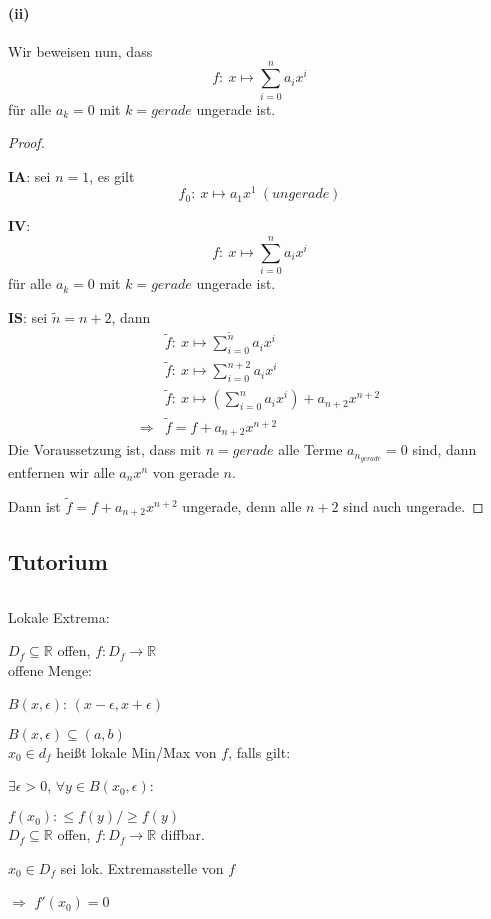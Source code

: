 \newpage

\paragraph{(ii)}

Wir beweisen nun, dass
\begin{equation*}
f:\ x\mapsto\sum_{i=0}^n a_ix^i
\end{equation*}
für alle $a_k=0$ mit $k=gerade$ ungerade ist.

\begin{proof}
$ $\newline

$\mathbf{IA}$:
sei $n=1$, es gilt
\begin{equation*}
f_0:\ x\mapsto a_1x^1\ (ungerade)
\end{equation*}

$\mathbf{IV}$:
\begin{equation*}
f:\ x\mapsto\sum_{i=0}^n a_ix^i
\end{equation*}
für alle $a_k=0$ mit $k=gerade$ ungerade ist.

$\mathbf{IS}$:
sei $\tilde{n}=n+2$, dann
\begin{align*}
&\tilde{f}:\ x\mapsto\sum_{i=0}^{\tilde{n}} a_ix^i\\
&\tilde{f}:\ x\mapsto\sum_{i=0}^{n+2} a_ix^i\\
&\tilde{f}:\ x\mapsto(\sum_{i=0}^{n} a_ix^i)+a_{n+2}x^{n+2}\\
\Rightarrow & \tilde{f}=f+a_{n+2}x^{n+2}
\end{align*}
Die Voraussetzung ist, dass mit $n=gerade$ alle Terme $a_{n_{gerade}}=0$ sind, dann entfernen wir alle $a_nx^n$ von gerade $n$.

Dann ist $\tilde{f}=f+a_{n+2}x^{n+2}$ ungerade, denn alle $n+2$ sind auch ungerade.
\end{proof}

\newpage

\subsection{Tutorium}
$ $\newline

Lokale Extrema:

$D_f\subseteq \mathbb{R}$ offen, $f:D_f\rightarrow\mathbb{R}$\\

offene Menge:

$B(x,\epsilon)$: $(x-\epsilon,x+\epsilon)$

$B(x,\epsilon)\subseteq(a,b)$\\

$x_0\in d_f$ heißt lokale Min/Max von $f$, falls gilt:

$\exists\epsilon>0$, $\forall y\in B(x_0,\epsilon)$:

$f(x_0):\leq f(y)/\geq f(y)$\\

$D_f\subseteq \mathbb{R}$ offen, $f:D_f\rightarrow\mathbb{R}$ diffbar.

$x_0\in D_f$ sei lok. Extremasstelle von $f$

$\Rightarrow$ $f'(x_0)=0$
